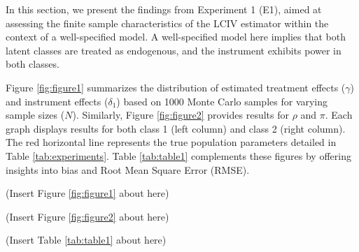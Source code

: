 \documentclass[12pt]{article}
\begin{document}
In this section, we present the findings from Experiment 1 (E1), aimed at assessing the finite sample characteristics of the LCIV estimator within the context of a well-specified model. A well-specified model here implies that both latent classes are treated as endogenous, and the instrument exhibits power in both classes.


Figure \ref{fig:figure1} summarizes the distribution of estimated treatment effects ($\gamma$) and instrument effects ($\delta_1$) based on 1000 Monte Carlo samples for varying sample sizes ($N$). Similarly, Figure \ref{fig:figure2} provides results for $\rho$ and $\pi$. Each graph displays results for both class 1 (left column) and class 2 (right column). The red horizontal line represents the true population parameters detailed in Table \ref{tab:experiments}. Table \ref{tab:table1} complements these figures by offering insights into bias and Root Mean Square Error (RMSE). 

\begin{center}
	(Insert Figure \ref{fig:figure1} about here)
\end{center}

\begin{center}
	(Insert Figure \ref{fig:figure2} about here)
\end{center}

\begin{center}
	(Insert Table \ref{tab:table1} about here)
\end{center}

\end{document}

